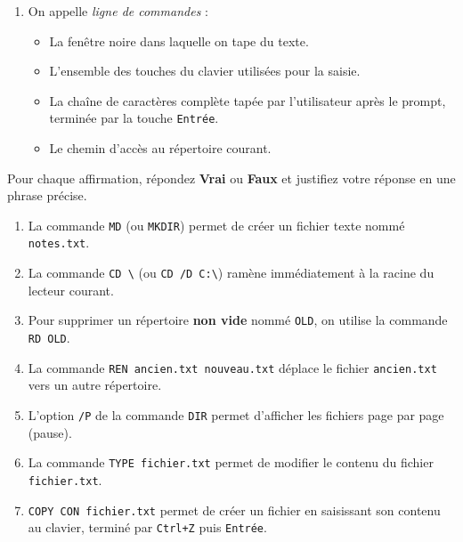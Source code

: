 \documentclass[11pt]{article}
\begin{document}
\begin{exercice}
\begin{enumerate}
\begin{itemize}
    \end{itemize}
    \item On appelle \emph{ligne de commandes} :
    \begin{itemize}
        \item[A)] La fenêtre noire dans laquelle on tape du texte.
        \item[B)] L'ensemble des touches du clavier utilisées pour la saisie.
        \item[C)] La chaîne de caractères complète tapée par l'utilisateur après le prompt, terminée par la touche \texttt{Entrée}.
        \item[D)] Le chemin d'accès au répertoire courant.
    \end{itemize}
\end{enumerate}
\end{exercice}

\begin{exercice}
Pour chaque affirmation, répondez \textbf{Vrai} ou \textbf{Faux} et justifiez votre réponse en une phrase précise.
\begin{enumerate}
    \item La commande \texttt{MD} (ou \texttt{MKDIR}) permet de créer un fichier texte nommé \texttt{notes.txt}.
    \item La commande \texttt{CD\ \textbackslash} (ou \texttt{CD /D C:\textbackslash}) ramène immédiatement à la racine du lecteur courant.
    \item Pour supprimer un répertoire \textbf{non vide} nommé \texttt{OLD}, on utilise la commande \texttt{RD OLD}.
    \item La commande \texttt{REN ancien.txt nouveau.txt} déplace le fichier \texttt{ancien.txt} vers un autre répertoire.
    \item L'option \texttt{/P} de la commande \texttt{DIR} permet d'afficher les fichiers page par page (pause).
    \item La commande \texttt{TYPE fichier.txt} permet de modifier le contenu du fichier \texttt{fichier.txt}.
    \item \texttt{COPY CON fichier.txt} permet de créer un fichier en saisissant son contenu au clavier, terminé par \texttt{Ctrl+Z} puis \texttt{Entrée}.
\end{enumerate}
\end{exercice}
\end{document}
